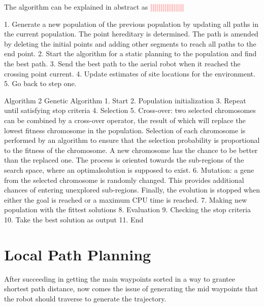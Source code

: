 The algorithm can be explained in abstract as 
\textcolor{red}{|||||||||||||||||}

1. Generate a new population of the previous population by updating all paths in the current
population. The point hereditary is determined. The path is amended by deleting the initial
points and adding other segments to reach all paths to the end point.
2. Start the algorithm for a static planning to the population and find the best path.
3. Send the best path to the aerial robot when it reached the crossing point current.
4. Update estimates of site locations for the environment.
5. Go back to step one.

Algorithm 2 Genetic Algorithm
1. Start
2. Population initialization
3. Repeat until satisfying stop criteria
4. Selection
5. Cross-over: two selected chromosomes can be combined by a cross-over operator, the result of which will replace the lowest fitness chromosome in the population. Selection of each chromosome is performed by an algorithm to ensure that the selection probability is proportional to the fitness of the chromosome. A new chromosome has the chance to be better than the replaced one. The process is oriented towards the sub-regions of the search space, where an optimalsolution is supposed to exist.
6. Mutation: a gene from the selected chromosome is randomly changed. This provides additional chances of entering unexplored sub-regions. Finally, the evolution is stopped when either the goal is reached or a maximum CPU time is reached.
7. Making new population with the fittest solutions
8. Evaluation
9. Checking the stop criteria
10. Take the best solution as output
11. End





\section{Local Path Planning} \label{local_path_planning}

After succeeding in getting the main waypoints sorted in a way to grantee shortest path distance, now comes the issue of generating the mid waypoints that the robot should traverse to generate the trajectory.


